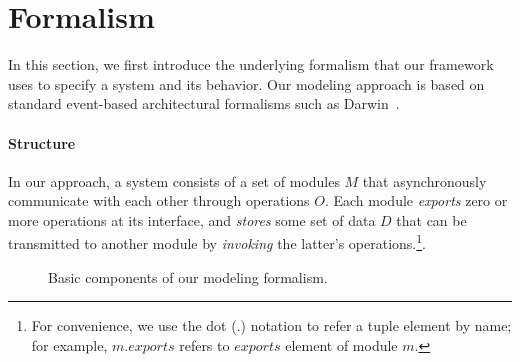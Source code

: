 
\section{Formalism}
\label{sec-formalism}

In this section, we first introduce the underlying formalism that our
framework uses to specify a system and its behavior. Our modeling
approach is based on standard event-based architectural formalisms
such as Darwin~\cite{darwin}.

\paragraph{\textbf{Structure}} In our approach, a system consists of a set of
modules $M$ that asynchronously communicate with each other through
operations $O$.  Each module \textit{exports} zero or more operations
at its interface, and \textit{stores} some set of data $D$ that can be
transmitted to another module by \textit{invoking} the latter's
operations.\footnote{For convenience, we use the dot (.) notation to refer
  a tuple element by name; for example, $m.exports$ refers to $exports$
  element of module $m$.}.

\begin{figure}[!t]
\caption{Basic components of our modeling formalism.}
\label{fig-formalism}
\end{figure}

